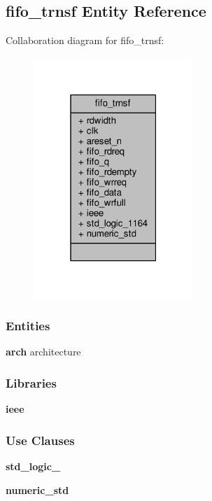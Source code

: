 \subsection{fifo\+\_\+trnsf Entity Reference}
\label{classfifo__trnsf}


Collaboration diagram for fifo\+\_\+trnsf\+:\nopagebreak
\begin{figure}[H]
\begin{center}
\leavevmode
\includegraphics[width=171pt]{d0/d61/classfifo__trnsf__coll__graph}
\end{center}
\end{figure}
\subsubsection*{Entities}
\begin{DoxyCompactItemize}
\item 
{\bf arch} architecture
\end{DoxyCompactItemize}
\subsubsection*{Libraries}
 \begin{DoxyCompactItemize}
\item 
{\bf ieee} 
\end{DoxyCompactItemize}
\subsubsection*{Use Clauses}
 \begin{DoxyCompactItemize}
\item 
{\bf std\+\_\+logic\+\_}   
\item 
{\bf numeric\+\_\+std}   
\end{DoxyCompactItemize}
